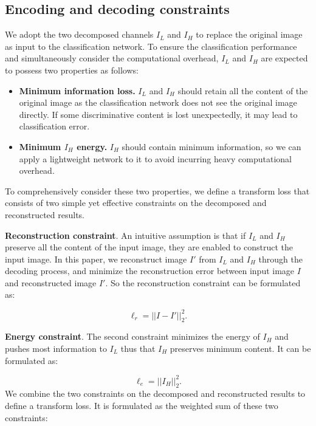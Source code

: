 \documentclass[letterpaper]{article} %
\begin{document}
\subsection{Encoding and decoding constraints}
We adopt the two decomposed channels $I_L$ and $I_H$ to replace the original image as input to the classification network.  To ensure the classification performance and simultaneously consider the computational overhead, $I_L$ and $I_H$ are expected to possess two properties as follows:
\begin{itemize}
  \item \textbf{Minimum information loss. } $I_L$ and $I_H$ should retain all the content of the original image as the classification network does not see the original image directly. If some discriminative content is lost unexpectedly, it may lead to classification error.
  \item \textbf{Minimum $I_H$ energy. } $I_H$ should contain minimum information, so we can apply a lightweight network to it to avoid incurring heavy computational overhead.
\end{itemize}
To comprehensively consider these two properties, we define a transform loss that consists of two simple yet effective constraints on the decomposed and reconstructed results.

\noindent\textbf{Reconstruction constraint}.
An intuitive assumption is that if $I_L$ and $I_H$ preserve all the content of the input image, they are enabled to construct the input image. In this paper, we reconstruct image $I'$ from $I_L$ and $I_H$ through the decoding process, and minimize the reconstruction error between input image $I$ and reconstructed image $I'$. So the reconstruction constraint can be formulated as:

\begin{equation}
   \ell_r=\vert\vert I-I' \vert\vert_2^2.
\end{equation}

\noindent\textbf{Energy constraint}.
The second constraint minimizes the energy of $I_H$ and pushes most information to $I_L$ thus that $I_H$ preserves minimum content. It can be formulated as:

\begin{equation}
   \ell_e=\vert\vert I_H \vert\vert_2^2.
\end{equation}
We combine the two constraints on the decomposed and reconstructed results to define a transform loss. It is formulated as the weighted sum of these two constraints:
\end{document}
